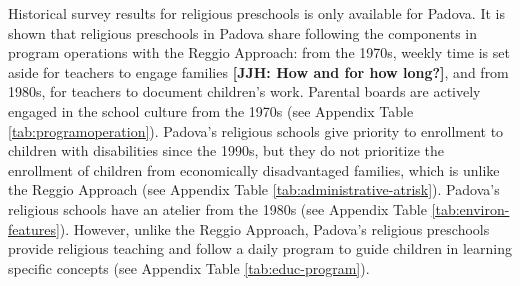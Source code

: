 Historical survey results for religious preschools is only available for Padova. It is shown that religious preschools in Padova share following the components in program operations with the Reggio Approach: from the 1970s, weekly time is set aside for teachers to engage families \textbf{[JJH: How and for how long?]}, and from 1980s, for teachers to document children's work. Parental boards are actively engaged in the school culture from the 1970s (see Appendix Table \ref{tab:programoperation}). Padova's religious schools give priority to enrollment to children with disabilities since the 1990s, but they do not prioritize the enrollment of children from economically disadvantaged families, which is unlike the Reggio Approach (see Appendix Table \ref{tab:administrative-atrisk}). Padova's religious schools have an atelier from the 1980s (see Appendix Table \ref{tab:environ-features}). However, unlike the Reggio Approach, Padova's religious preschools provide religious teaching and follow a daily program to guide children in learning specific concepts (see Appendix Table \ref{tab:educ-program}).

